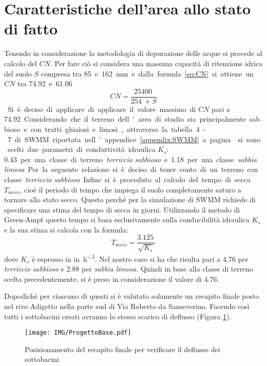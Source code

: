 \section{Caratteristiche dell’area allo stato di fatto}
Tenendo in considerazione la metodologia di depurazione delle acque si procede al calcolo del $CN$. 
Per fare ciò si considera una massima capacità di ritenzione idrica del suolo $S$ compresa tra \SI{85} e \SI{162}{\milli\metre} e dalla formula \ref{eq:CN} si ottiene un $CN$ tra \SI{74.92} e \SI{61.06}.
\begin{equation}
\label{eq:CN}
    CN = \frac{\SI{25400}{}}{\SI{254}{} + S}
\end{equation}
Si è deciso di applicare di applicare il valore massimo di $CN$ pari a \SI{74.92}.

Considerando che il terreno dell'area di studio sia principalmente sabbioso e con tratti ghiaiosi e limosi, attraverso la tabella 4-7 di SWMM riportata nell'appendice \ref{appendix:SWMM} a pagina \pageref{SWMM:tabella4-7} si sono scelti due parametri di conduttività idraulica $K_s$: \SI{0.43} per una classe di terreno \emph{terriccio sabbioso} e \SI{1.18} per una classe \emph{sabbia limosa}. 
Per la seguente relazione si è deciso di tener conto di un terreno con classe \emph{terriccio sabbioso}.

Infine si è proceduto al calcolo del tempo di secca $T_{\text{secco}}$, cioè il periodo di tempo che impiega il suolo completamente saturo a tornare allo stato secco.
Questo perché per la simulazione di SWMM richiede di specificare una stima del tempo di secca in giorni.
Utilizzando il metodo di Green-Ampt questo tempo si basa esclusivamente sulla conducibilità idraulica $K_s$ e la sua stima si calcola con la formula: 
\begin{equation}
    T_{\text{secco}} = \frac{\SI{3.125}{}}{\sqrt{K_s}}
\end{equation}
dove $K_s$ è espresso in \si{in\per\hour}.
Nel nostro caso si ha che risulta pari a \SI{4.76}{\days} per \emph{terriccio sabbioso} e \SI{2.88}{\days} per \emph{sabbia limosa}. 
Quindi in base alla classe di terreno scelta precedentemente, si è preso in considerazione il valore di \SI{4.76}{\days}.

Dopodiché per ciascuno di questi si è valutato solamente un recapito finale posto nel rivo Adigetto nella parte sud di Via Roberto da Sanseverino. 
Facendo così tutti i sottobacini creati avranno lo stesso scarico di deflusso (Figura \ref{fig:ProgettoBase}).
\begin{figure}[p]
    \centering
    \texttt{[image: IMG/ProgettoBase.pdf]} 
    \caption{Posizionamento del recapito finale per verificare il deflusso dei sottobacini}
    \label{fig:ProgettoBase}
\end{figure}

